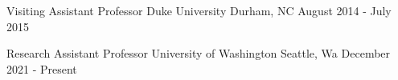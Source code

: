 


\begin{cventries}

  \cventry
    {Visiting Assistant Professor} %
    {Duke University} %
    {Durham, NC} %
    {August 2014 - July 2015} %
    {
    }

  \cventry
    {Research Assistant Professor} %
    {University of Washington} %
    {Seattle, Wa} %
    {December 2021 - Present} %
    {
    }

    
\end{cventries}

